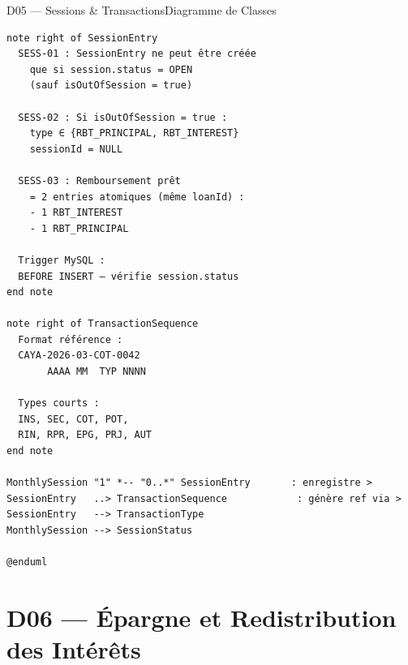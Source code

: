 \documentclass[12pt, a4paper]{report}
\begin{document}
\begin{diagramBox}{D05 — Sessions \& Transactions}{Diagramme de Classes}
\begin{lstlisting}
note right of SessionEntry
  SESS-01 : SessionEntry ne peut être créée
    que si session.status = OPEN
    (sauf isOutOfSession = true)

  SESS-02 : Si isOutOfSession = true :
    type ∈ {RBT_PRINCIPAL, RBT_INTEREST}
    sessionId = NULL

  SESS-03 : Remboursement prêt
    = 2 entries atomiques (même loanId) :
    - 1 RBT_INTEREST
    - 1 RBT_PRINCIPAL

  Trigger MySQL :
  BEFORE INSERT — vérifie session.status
end note

note right of TransactionSequence
  Format référence :
  CAYA-2026-03-COT-0042
       AAAA MM  TYP NNNN

  Types courts :
  INS, SEC, COT, POT,
  RIN, RPR, EPG, PRJ, AUT
end note

MonthlySession "1" *-- "0..*" SessionEntry       : enregistre >
SessionEntry   ..> TransactionSequence            : génère ref via >
SessionEntry   --> TransactionType
MonthlySession --> SessionStatus

@enduml
\end{lstlisting}
\end{diagramBox}

\section{D06 — Épargne et Redistribution des Intérêts}
\end{document}
